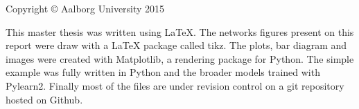 \thispagestyle{empty}
{\small
\strut\vfill %
\noindent Copyright \copyright{} Aalborg University 2015\par
\vspace{0.2cm}
\noindent This master thesis was written using LaTeX. The networks figures present on this report were draw with a LaTeX package called tikz. The plots, bar diagram and images were created with Matplotlib, a rendering package for Python. The simple example was fully written in Python and the broader models trained with Pylearn2. Finally most of the files are under revision control on a git repository hosted on Github.

}
\clearpage

